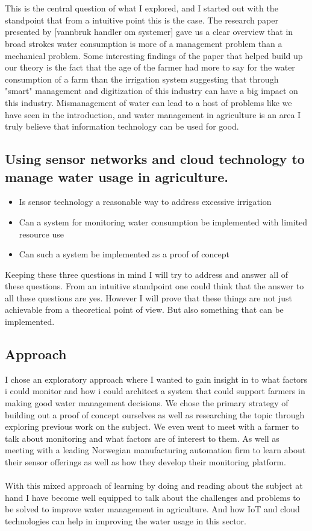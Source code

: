 \documentclass[]{uiophd}
\begin{document}
\\\\
This is the central question of what I explored, and I started out with the standpoint that from a intuitive point this is the case. The research paper presented by [vannbruk handler om systemer] gave us a clear overview that in broad strokes water consumption is more of a management problem than a mechanical problem. Some interesting findings of the paper that helped build up our theory is the fact that the age of the farmer had more to say for the water consumption of a farm than the irrigation system suggesting that through "smart" management and digitization of this industry can have a big impact on this industry. Mismanagement of water can lead to a host of problems like we have seen in the introduction, and water management in agriculture is an area I truly believe that information technology can be used for good.
\subsection{Using sensor networks and cloud technology to manage water usage in agriculture.}
\begin{itemize}
  \item Is sensor technology a reasonable way to address excessive irrigation
  \item Can a system for monitoring water consumption be implemented with limited resource use
  \item Can such a system be implemented as a proof of concept
\end{itemize}
Keeping these three questions in mind I will try to address and answer all of these questions. From an intuitive standpoint one could think that the answer to all these questions are yes. However I will prove that these things are not just achievable from a theoretical point of view. But also something that can be implemented.

\subsection{Approach}
I chose an exploratory approach where I wanted to gain insight in to what factors i could monitor and how i could architect a system that could support farmers in making good water management decisions. We chose the primary strategy of building out a proof of concept ourselves as well as researching the topic through exploring previous work on the subject. We even went to meet with a farmer to talk about monitoring and what factors are of interest to them. As well as meeting with a leading Norwegian manufacturing automation firm to learn about their sensor offerings as well as how they develop their monitoring platform.
\\\\
With this mixed approach of learning by doing and reading about the subject at hand I have become well equipped to talk about the challenges and problems to be solved to improve water management in agriculture. And how IoT and cloud technologies can help in improving the water usage in this sector.
\end{document}
